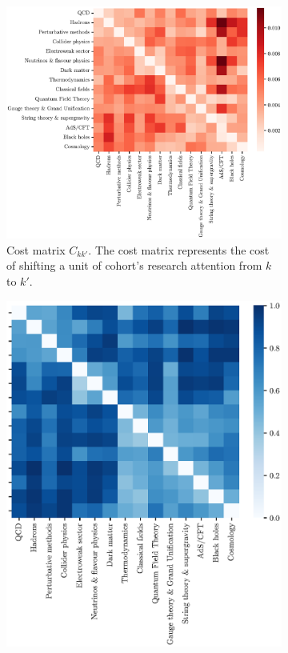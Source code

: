 \documentclass{article}
\begin{document}
\begin{figure}[!h]
\begin{subfigure}{.475\textwidth}
    \centering
    \includegraphics[height=1\textwidth]{Fig6a}
    \caption{Cost matrix $C_{kk'}$. The cost matrix represents the cost of shifting a unit of cohort's research attention from $k$ to $k'$.}
    \label{fig:cost_matrix}
\end{subfigure}\hfill%
\begin{subfigure}{0.475\textwidth}
    \centering
    \includegraphics[height=1\textwidth]{Fig6b}

\end{subfigure}
\end{figure}
\end{document}
